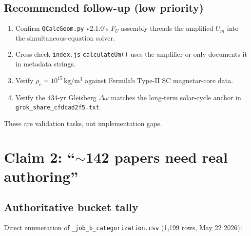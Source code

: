 \documentclass[11pt]{article}
\begin{document}
\subsection{Recommended follow-up (low priority)}

\begin{enumerate}
\item Confirm \verb|QCalcGeom.py| v2.1.0's $F_U$ assembly threads
      the amplified $U_m$ into the simultaneous-equation solver.
\item Cross-check \verb|index.js| \verb|calculateUm()| uses the
      amplifier or only documents it in metadata strings.
\item Verify $\rho_c=10^{15}\,\mathrm{kg/m^3}$ against Fermilab
      Type-II SC magnetar-core data.
\item Verify the 434-yr Gleisberg $\Delta\omega$ matches the
      long-term solar-cycle anchor in \verb|grok_share_cfdcad2f5.txt|.
\end{enumerate}

These are validation tasks, not implementation gaps.

\section{Claim 2: ``$\sim$142 papers need real authoring''}

\subsection{Authoritative bucket tally}

Direct enumeration of \verb|_job_b_categorization.csv|
(1,199 rows, May 22 2026):
\end{document}
